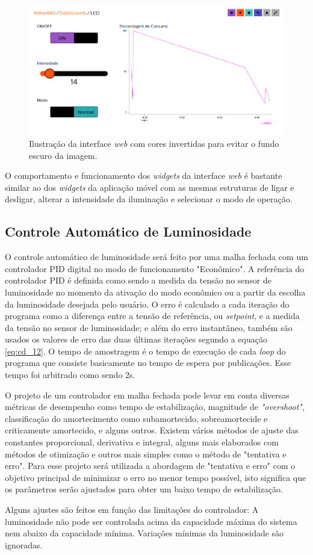 \begin{figure}[ht]
    \begin{center}
    \includegraphics[width=\textwidth]{figuras/adaio.PNG}
    \end{center}
    \caption[Ilustração da interface \textit{web}.]{Ilustração da interface \textit{web} com cores invertidas para evitar o fundo escuro da imagem.}
    \label{adaio}
\end{figure}

O comportamento e funcionamento dos \textit{widgets} da interface \textit{web} é bastante similar ao dos \textit{widgets} da aplicação móvel com as mesmas estruturas de ligar e desligar, alterar a intensidade da iluminação e selecionar o modo de operação.

\subsection{Controle Automático de Luminosidade}

O controle automático de luminosidade será feito por uma malha fechada com um controlador PID digital no modo de funcionamento "Econômico". A referência do controlador \acf{PID} é definida como sendo a medida da tensão no sensor de luminosidade no momento da ativação do modo econômico ou a partir da escolha da luminosidade desejada pelo usuário. O erro é calculado a cada iteração do programa como a diferença entre a tensão de referência, ou \textit{setpoint}, e a  medida da tensão no sensor de luminosidade; e além do erro instantâneo, também são usados os valores de erro das duas últimas iterações segundo a equação \ref{eq:cd_12}. O tempo de amostragem é o tempo de execução de cada \textit{loop} do programa que consiste basicamente no tempo de espera por publicações. Esse tempo foi arbitrado como sendo 2s.

O projeto de um controlador em malha fechada pode levar em conta diversas métricas de desempenho como tempo de estabilização, magnitude de \textit{"overshoot"}, classificação do amortecimento como subamortecido, sobreamortecide e criticamente amortecido, e alguns outros. Existem vários métodos de ajuste das constantes proporcional, derivativa e integral, alguns mais elaborados com métodos de otimização e outros mais simples como o método de "tentativa e erro". Para esse projeto será utilizada a abordagem de "tentativa e erro" com o objetivo principal de minimizar o erro no menor tempo possível, isto significa que os parâmetros serão ajustados para obter um baixo tempo de estabilização.

Alguns ajustes são feitos em função das limitações do controlador: A luminosidade não pode ser controlada acima da capacidade máxima do sistema nem abaixo da capacidade mínima. Variações mínimas da luminosidade são ignoradas.


